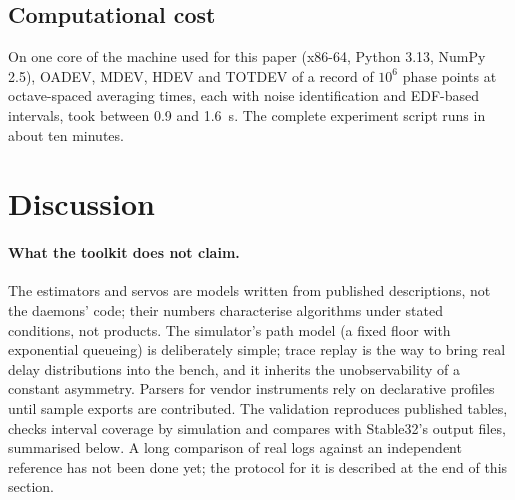\documentclass[11pt,a4paper]{article}
\begin{document}
\subsection{Computational cost}

On one core of the machine used for this paper (x86-64, Python 3.13, NumPy 2.5), OADEV, MDEV, HDEV
and TOTDEV of a record of $10^6$ phase points at octave-spaced averaging times, each with noise
identification and EDF-based intervals, took between 0.9 and 1.6~s. The complete experiment script
runs in about ten minutes.

\section{Discussion}\label{sec:discussion}

\paragraph{What the toolkit does not claim.} The estimators and servos are models written from published
descriptions, not the daemons' code; their numbers characterise algorithms under stated conditions, not
products. The simulator's path model (a fixed floor with exponential queueing) is deliberately simple;
trace replay is the way to bring real delay distributions into the bench, and it inherits the
unobservability of a constant asymmetry. Parsers for vendor instruments rely on declarative profiles
until sample exports are contributed. The validation reproduces published tables, checks interval
coverage by simulation and compares with Stable32's output files, summarised below. A long comparison of
real logs against an independent reference has not been done yet; the protocol for it is described at
the end of this section.
\end{document}
